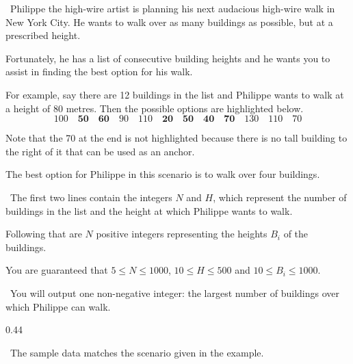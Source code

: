

\Question\ Philippe the high-wire artist is planning his next audacious high-wire walk in
New York City. He wants to walk over as many buildings as possible, but at a prescribed
height.

Fortunately, he has a list of consecutive building heights and he wants you to assist in
finding the best option for his walk.

For example, say there are 12 buildings in the list and Philippe wants to walk at a height
of 80 metres. Then the possible options are highlighted below.\[
  100 \quad
  \mathbf{50} \quad \mathbf{60} \quad
  90 \quad 110 \quad
  \mathbf{20} \quad \mathbf{50} \quad \mathbf{40} \quad \mathbf{70} \quad
  130 \quad 110 \quad 70
\]

Note that the 70 at the end is not highlighted because there is no tall building to the
right of it that can be used as an anchor.

The best option for Philippe in this scenario is to walk over four buildings.

\Input\ The first two lines contain the integers $N$ and $H$, which represent the number
of buildings in the list and the height at which Philippe wants to walk.

Following that are $N$ positive integers representing the heights $B_i$ of the buildings.

You are guaranteed that $5 \le N \le 1000$, $10 \le H \le 500$ and $10 \le B_i \le 1000$.

\Output\ You will output one non-negative integer: the largest number of buildings over
which Philippe can walk.

\Sample

       {0.4}{4}

\Explanation\ The sample data matches the scenario given in the example.
